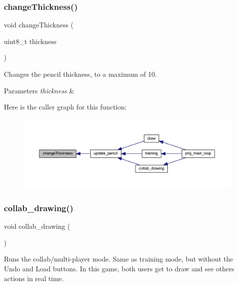 \subsubsection{\texorpdfstring{change\+Thickness()}{changeThickness()}}
{\footnotesize\ttfamily void change\+Thickness (\begin{DoxyParamCaption}\item[{uint8\+\_\+t}]{thickness }\end{DoxyParamCaption})}



Changes the pencil thickness, to a maximum of 10. 


\begin{DoxyParams}{Parameters}
{\em thickness} & \\
\hline
\end{DoxyParams}
Here is the caller graph for this function\+:\nopagebreak
\begin{figure}[H]
\begin{center}
\leavevmode
\includegraphics[width=350pt]{group__pengoo_ga771576cc26d893bc389c414f151af27f_icgraph}
\end{center}
\end{figure}
\mbox{\label{group__pengoo_gaa5d8d3d5af977d3d9e7141bf2693c81e}} 
\subsubsection{\texorpdfstring{collab\+\_\+drawing()}{collab\_drawing()}}
{\footnotesize\ttfamily void collab\+\_\+drawing (\begin{DoxyParamCaption}{ }\end{DoxyParamCaption})}



Runs the collab/multi-\/player mode. Same as training mode, but without the Undo and Load buttons. In this game, both users get to draw and see other\textquotesingle{}s actions in real time. 

